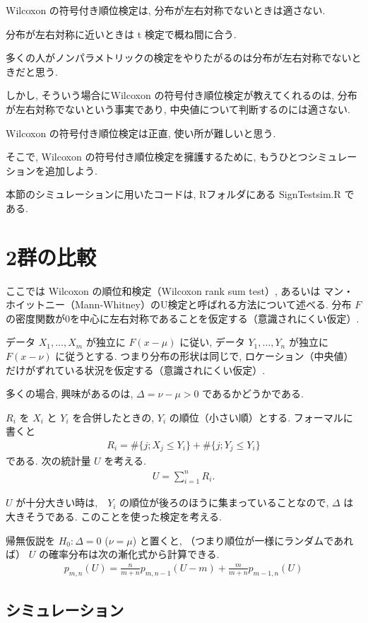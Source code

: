 \documentclass[12pt]{jsarticle}
\begin{document}
Wilcoxon の符号付き順位検定は, 分布が左右対称でないときは適さない. 

分布が左右対称に近いときは t 検定で概ね間に合う. 

多くの人がノンパラメトリックの検定をやりたがるのは分布が左右対称でないときだと思う.

しかし, そういう場合にWilcoxon の符号付き順位検定が教えてくれるのは, 分布が左右対称でないという事実であり, 中央値について判断するのには適さない.

 Wilcoxon の符号付き順位検定は正直, 使い所が難しいと思う.
 
 そこで,  Wilcoxon の符号付き順位検定を擁護するために, もうひとつシミュレーションを追加しよう.
 
 本節のシミュレーションに用いたコードは, Rフォルダにある SignTestsim.R である.
 
 \section{2群の比較}

ここでは Wilcoxon の順位和検定（Wilcoxon rank sum test）, あるいは マン・ホイットニー（Mann-Whitney）のU検定と呼ばれる方法について述べる. 
分布 $F$ の密度関数が0を中心に左右対称であることを仮定する（意識されにくい仮定）.

データ $X_1, \ldots , X_m$ が独立に $F(x-\mu)$ に従い, データ $Y_1, \ldots , Y_n$ が独立に $F(x-\nu)$ に従うとする. つまり分布の形状は同じで, ロケーション（中央値）だけがずれている状況を仮定する（意識されにくい仮定）.

多くの場合, 興味があるのは,  $\Delta=\nu-\mu>0$ であるかどうかである. 

$R_i$ を $X_i$ と $Y_i$ を合併したときの, $Y_i$ の順位（小さい順）とする.
フォーマルに書くと
\begin{align}
R_i = \#\{j; X_j\le Y_i\}+\#\{j; Y_j\le Y_i\}
\end{align}
である. 
次の統計量 $U$ を考える. 
\begin{align}
U = \sum_{i=1}^{n}R_i.
\end{align}

$U$ が十分大きい時は,　$Y_i$ の順位が後ろのほうに集まっていることなので, $\Delta$ は大きそうである.
このことを使った検定を考える.

帰無仮説を $H_0: \Delta=0$ ($\nu=\mu$) と置くと, （つまり順位が一様にランダムであれば） $U$ の確率分布は次の漸化式から計算できる.
\begin{align}
p_{m,n}(U)=\frac{n}{m+n} p_{m,n-1}(U-m)+\frac{m}{m+n} p_{m-1,n}(U)
\end{align}

\subsection{シミュレーション}
\end{document}
